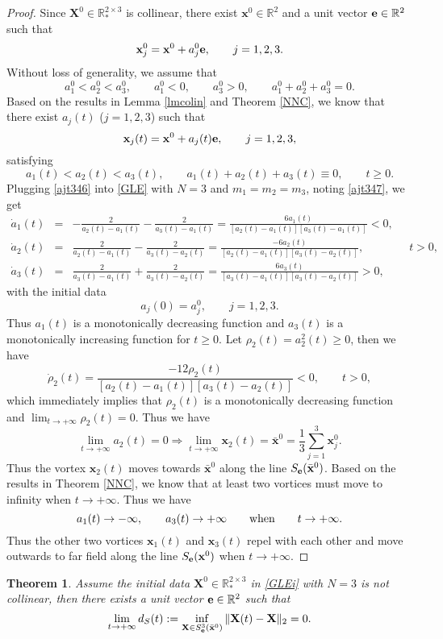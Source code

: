 \documentclass{aims}
\theoremstyle{plain}
\newtheorem{theorem}{Theorem}[section]
\theoremstyle{definition}
\newcommand{\bx}{{\mathbf x}}
\newcommand{\bX}{{\mathbf X}}
\newcommand{\nn}{\nonumber}
\newcommand{\be} {\begin{equation}}
\newcommand{\ee}{\end{equation}}
\newcommand{\bea}{\begin{eqnarray}}
\newcommand{\eea}{\end{eqnarray} }
\begin{document}
\begin{proof} Since $\bX^0\in {\mathbb R}_*^{2\times 3}$ is collinear, there exist $\bx^0\in {\mathbb R}^2$ and a unit vector
${\bf e}\in {\mathbb R}^2$ such that
\be
\bx_j^0=\bx^0+a_j^0 {\bf e}, \qquad j=1,2,3.\nonumber
\ee
Without loss of generality, we assume that
\be%
 a_1^0<a_2^0<a_3^0, \qquad a_1^0<0, \qquad a_3^0>0, \qquad a_1^0+a_2^0+a_3^0=0.\nonumber
\ee
Based on the results in Lemma \ref{lmcolin} and Theorem \ref{NNC},
we know that there exist $a_j(t)$ ($j=1,2,3$) such that
\be\label{ajt346}
\bx_j(t)=\bx^0+a_j(t) {\bf e}, \qquad j=1,2,3,
\ee
satisfying
\be\label{ajt347}
 a_1(t)<a_2(t)<a_3(t),  \qquad a_1(t)+a_2(t)+a_3(t)\equiv0, \qquad t\ge0.
\ee
Plugging \eqref{ajt346} into \eqref{GLE} with $N=3$ and $m_1=m_2=m_3$, noting \eqref{ajt347}, we get
\bea
\dot a_1(t)&=&-\frac{2}{a_2(t)-a_1(t)}-\frac{2}{a_3(t)-a_1(t)}=
\frac{6a_1(t)}{[a_2(t)-a_1(t)][a_3(t)-a_1(t)]}<0,\nn \\
\dot a_2(t)&=&\frac{2}{a_2(t)-a_1(t)}-\frac{2}{a_3(t)-a_2(t)}
=\frac{-6a_2(t)}{[a_2(t)-a_1(t)][a_3(t)-a_2(t)]},\qquad \qquad t>0,\nn \\
\dot a_3(t)&=&\frac{2}{a_3(t)-a_1(t)}+\frac{2}{a_3(t)-a_2(t)}
=\frac{6a_3(t)}{[a_3(t)-a_1(t)][a_3(t)-a_2(t)]}>0,\nn
\eea
with the initial data
\be\label{init3478}
a_j(0)=a_j^0, \qquad j=1,2,3.
\ee
Thus $a_1(t)$ is a monotonically decreasing function and
$a_3(t)$ is a monotonically increasing function for $t\ge0$.
Let $\rho_2(t)=a_2^2(t)\ge0$, then we have
\be
\dot \rho_2(t)=\frac{-12\rho_2(t)}{[a_2(t)-a_1(t)][a_3(t)-a_2(t)]}<0,\qquad t>0,\nonumber
\ee
which immediately implies that $\rho_2(t)$ is a monotonically decreasing function and $\lim_{t\to +\infty} \rho_2(t)=0$. Thus we have
\be
\lim_{t\to +\infty} a_2(t)=0 \Longrightarrow \lim_{t\to +\infty}
\bx_2(t)=\bar\bx^0=\frac{1}{3}\sum_{j=1}^3 \bx_j^0.\nonumber
\ee
Thus the vortex $\bx_2(t)$ moves towards $\bar\bx^0$ along the line $S_{\bf e}(\bar\bx^0)$.
Based on the results in Theorem \ref{NNC}, we know that at least two vortices
must move to infinity when $t\to+\infty$. Thus we have
\be
 a_1(t)\to -\infty, \qquad a_3(t)\to +\infty \qquad
\hbox{when} \qquad t\to +\infty. \nonumber
\ee
Thus the other two vortices $\bx_1(t)$ and $\bx_3(t)$ repel with each other and move outwards to far field along the line $S_{\bf e}(\bx^0)$ when $t\to+\infty$.
\end{proof}


\begin{theorem}\label{th2}
Assume the initial data $\bX^0\in {\mathbb R}_*^{2\times 3}$ in \eqref{GLEi} with $N=3$ is not collinear,
then there exists a unit vector
${\bf e}\in {\mathbb R}^2$ such that
\be\label{dSt231}
\lim_{t\rightarrow+\infty} d_S(t):=\inf_{\bX\in S_{\bf e}^3(\bar\bx^0)}
\|\bX(t)-\bX\|_2=0.
\ee
\end{theorem}
\end{document}
